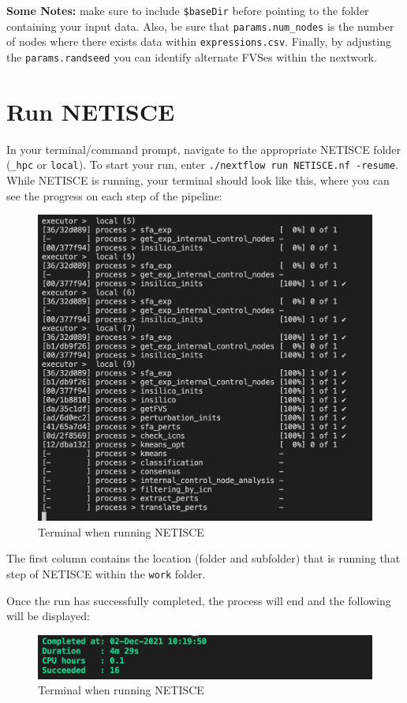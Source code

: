 \documentclass[
]{book}
\begin{document}
\textbf{Some Notes: } make sure to include \texttt{\$baseDir} before pointing to the folder containing your input data. Also, be sure that \texttt{params.num\_nodes} is the number of nodes where there exists data within \texttt{expressions.csv}. Finally, by adjusting the \texttt{params.randseed} you can identify alternate FVSes within the nextwork.

\hypertarget{run-netisce}{%
\section{Run NETISCE}\label{run-netisce}}

In your terminal/command prompt, navigate to the appropriate NETISCE folder (\texttt{\_hpc} or \texttt{local}). To start your run, enter \texttt{./nextflow\ run\ NETISCE.nf\ -resume}.
While NETISCE is running, your terminal should look like this, where you can see the progress on each step of the pipeline:

\begin{figure}

{\centering \includegraphics[width=0.5\linewidth]{images/running_shot} 

}

\caption{Terminal when running NETISCE}\label{fig:unnamed-chunk-7}
\end{figure}

The first column contains the location (folder and subfolder) that is running that step of NETISCE within the \texttt{work} folder.

Once the run has successfully completed, the process will end and the following will be displayed:

\begin{figure}

{\centering \includegraphics[width=0.5\linewidth]{images/completed} 

}

\caption{Terminal when running NETISCE}\label{fig:unnamed-chunk-8}
\end{figure}
\end{document}

